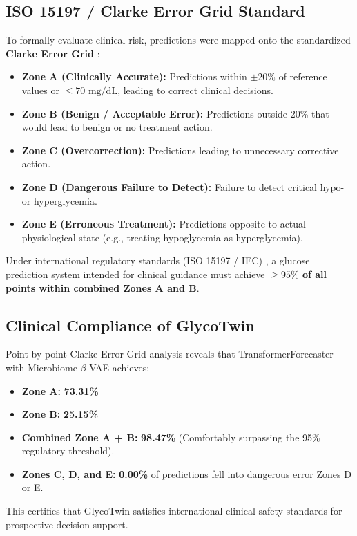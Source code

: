\subsection{ISO 15197 / Clarke Error Grid Standard}
To formally evaluate clinical risk, predictions were mapped onto the standardized \textbf{Clarke Error Grid} \cite{clarke1987evaluating, kovatchev2004evaluating}:
\begin{itemize}
    \item \textbf{Zone A (Clinically Accurate):} Predictions within $\pm 20\%$ of reference values or $\le 70\text{ mg/dL}$, leading to correct clinical decisions.
    \item \textbf{Zone B (Benign / Acceptable Error):} Predictions outside 20\% that would lead to benign or no treatment action.
    \item \textbf{Zone C (Overcorrection):} Predictions leading to unnecessary corrective action.
    \item \textbf{Zone D (Dangerous Failure to Detect):} Failure to detect critical hypo- or hyperglycemia.
    \item \textbf{Zone E (Erroneous Treatment):} Predictions opposite to actual physiological state (e.g., treating hypoglycemia as hyperglycemia).
\end{itemize}

Under international regulatory standards (ISO 15197 / IEC) \cite{battelino2019clinical, danne2017consensus}, a glucose prediction system intended for clinical guidance must achieve \textbf{$\ge 95\%$ of all points within combined Zones A and B}.

\subsection{Clinical Compliance of GlycoTwin}
Point-by-point Clarke Error Grid analysis reveals that TransformerForecaster with Microbiome $\beta$-VAE achieves:
\begin{itemize}
    \item \textbf{Zone A:} \textbf{73.31\%}
    \item \textbf{Zone B:} \textbf{25.15\%}
    \item \textbf{Combined Zone A + B:} \textbf{98.47\%} (Comfortably surpassing the 95\% regulatory threshold).
    \item \textbf{Zones C, D, and E:} \textbf{0.00\%} of predictions fell into dangerous error Zones D or E.
\end{itemize}

This certifies that GlycoTwin satisfies international clinical safety standards for prospective decision support.
